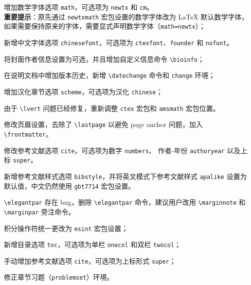 \documentclass[lang=cn,newtx,10pt,scheme=chinese,pad,twocol]{zznote}
\begin{document}
\begin{change}
	\item 增加数学字体选项 \lstinline{math}，可选项为 \lstinline{newtx} 和 \lstinline{cm}。\\
	\textbf{重要提示}：原先通过 \lstinline{newtxmath} 宏包设置的数学字体改为 \LaTeX{} 默认数学字体，如果需要保持原来的字体，需要显式声明数学字体（\lstinline{math=newtx}）；
	\item 新增中文字体选项 \lstinline{chinesefont}，可选项为 \lstinline{ctexfont}、\lstinline{founder} 和 \lstinline{nofont}。
	\item 将封面作者信息设置为可选，并且增加自定义信息命令 \lstinline{\bioinfo}；
	\item 在说明文档中增加版本历史，新增 \lstinline{\datechange} 命令和 \lstinline{change} 环境；
	\item 增加汉化章节选项 \lstinline{scheme}，可选项为汉化 \lstinline{chinese}；
	\item 由于 \lstinline{\lvert} 问题已经修复，重新调整 \lstinline{ctex} 宏包和 \lstinline{amsmath} 宏包位置。
	\item 修改页眉设置，去除了 \lstinline{\lastpage} 以避免 page anchor 问题，加入 \lstinline{\frontmatter}。
	\item 修改参考文献选项 \lstinline{cite}，可选项为数字 \lstinline{numbers}、 作者-年份 \lstinline{authoryear} 以及上标 \lstinline{super}。
	\item 新增参考文献样式选项 \lstinline{bibstyle}，并将英文模式下参考文献样式 \lstinline{apalike} 设置为默认值，中文仍然使用 \lstinline{gbt7714} 宏包设置。
\end{change}


\begin{change}
	\item \lstinline{\elegantpar} 存在 bug，删除 \lstinline{\elegantpar} 命令，建议用户改用 \lstinline{\marginnote} 和 \lstinline{\marginpar} 旁注命令。
	\item 积分操作符统一更改为 \lstinline{esint} 宏包设置；
	\item 新增目录选项 \lstinline{toc}，可选项为单栏 \lstinline{onecol} 和双栏 \lstinline{twocol}；
	\item 手动增加参考文献选项 \lstinline{cite}，可选项为上标形式 \lstinline{super}；
	\item 修正章节习题（\lstinline{problemset}）环境。
\end{change}

\end{document}
